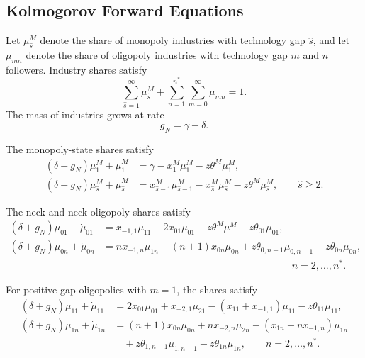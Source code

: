 \documentclass[12pt]{article}
\begin{document}
\subsection{Kolmogorov Forward Equations}\label{app:KFE}

Let \(\mu^M_{\hat s}\) denote the share of monopoly industries with technology gap
\(\hat s\), and let \(\mu_{mn}\) denote the share of oligopoly industries with technology gap
\(m\) and \(n\) followers. Industry shares satisfy
\begin{equation}
\sum_{\hat s=1}^{\infty}\mu^M_{\hat s}
+
\sum_{n=1}^{n^*}\sum_{m=0}^{\infty}\mu_{mn}
=
1.
\label{eq:share_sum_app}
\end{equation}
The mass of industries grows at rate
\begin{equation}
g_N=\gamma-\delta.
\label{eq:gN_app}
\end{equation}

The monopoly-state shares satisfy
\begin{align}
(\delta+g_N)\mu^M_1+\dot{\mu}^M_1
&=
\gamma
-x^M_1\mu^M_1
-z\theta^M\mu^M_1,
\label{eq:muM1_app}\\
(\delta+g_N)\mu^M_{\hat s}+\dot{\mu}^M_{\hat s}
&=
x^M_{\hat s-1}\mu^M_{\hat s-1}
-x^M_{\hat s}\mu^M_{\hat s}
-z\theta^M\mu^M_{\hat s},
\qquad \hat s\geq 2.
\label{eq:muMs_app}
\end{align}

The neck-and-neck oligopoly shares satisfy
\begin{align}
(\delta+g_N)\mu_{01}+\dot{\mu}_{01}
&=
x_{-1,1}\mu_{11}
-2x_{01}\mu_{01}
+z\theta^M\mu^M
-z\theta_{01}\mu_{01},
\label{eq:mu01_app}\\
(\delta+g_N)\mu_{0n}+\dot{\mu}_{0n}
&=
nx_{-1,n}\mu_{1n}
-(n+1)x_{0n}\mu_{0n}
+z\theta_{0,n-1}\mu_{0,n-1}
-z\theta_{0n}\mu_{0n},
\nonumber\\
&\hspace{8cm} n=2,\ldots,n^* .
\label{eq:mu0n_app}
\end{align}

For positive-gap oligopolies with \(m=1\), the shares satisfy
\begin{align}
(\delta+g_N)\mu_{11}+\dot{\mu}_{11}
&=
2x_{01}\mu_{01}
+x_{-2,1}\mu_{21}
-(x_{11}+x_{-1,1})\mu_{11}
-z\theta_{11}\mu_{11},
\label{eq:mu11_app}\\
(\delta+g_N)\mu_{1n}+\dot{\mu}_{1n}
&=
(n+1)x_{0n}\mu_{0n}
+nx_{-2,n}\mu_{2n}
-(x_{1n}+nx_{-1,n})\mu_{1n}
\nonumber\\
&\quad
+z\theta_{1,n-1}\mu_{1,n-1}
-z\theta_{1n}\mu_{1n},
\qquad n=2,\ldots,n^* .
\label{eq:mu1n_app}
\end{align}
\end{document}
